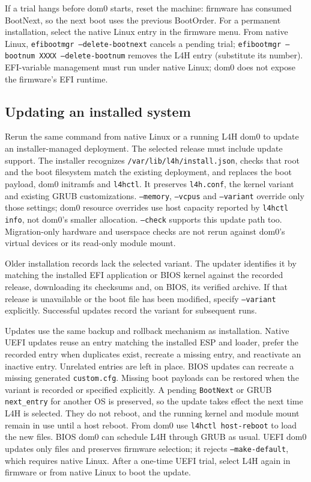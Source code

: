\documentclass[11pt,a4paper]{report}
\newcommand{\cmd}[1]{\texttt{#1}}
\newcommand{\file}[1]{\texttt{#1}}
\begin{document}
If a trial hangs before dom0 starts, reset the machine: firmware has
consumed BootNext, so the next boot uses the previous BootOrder. For a
permanent installation, select the native Linux entry in the firmware
menu. From native Linux, \cmd{efibootmgr --delete-bootnext} cancels a
pending trial; \cmd{efibootmgr --bootnum XXXX --delete-bootnum} removes
the L4H entry (substitute its number). EFI-variable management must run
under native Linux; dom0 does not expose the firmware's EFI runtime.

\subsection*{Updating an installed system}

Rerun the same command from native Linux or a running L4H dom0 to update
an installer-managed deployment. The selected release must include update
support. The installer recognizes \file{/var/lib/l4h/install.json},
checks that root and the boot filesystem match the existing deployment,
and replaces the boot payload, dom0 initramfs and \cmd{l4hctl}. It preserves
\file{l4h.conf}, the kernel variant and existing GRUB customizations.
\texttt{--memory}, \texttt{--vcpus} and \texttt{--variant} override only
those settings; dom0 resource overrides use host capacity reported by
\cmd{l4hctl info}, not dom0's smaller allocation. \texttt{--check} supports
this update path too. Migration-only hardware and userspace checks are
not rerun against dom0's virtual devices or its read-only module mount.

Older installation records lack the selected variant. The updater
identifies it by matching the installed EFI application or BIOS kernel
against the recorded release, downloading its checksums and, on BIOS,
its verified archive. If that release is unavailable or the boot file
has been modified, specify \texttt{--variant} explicitly. Successful
updates record the variant for subsequent runs.

Updates use the same backup and rollback mechanism as installation.
Native UEFI updates reuse an entry matching the installed ESP and loader,
prefer the recorded entry when duplicates exist, recreate a missing entry,
and reactivate an inactive entry. Unrelated entries are left in place.
BIOS updates can recreate a missing generated \file{custom.cfg}.
Missing boot payloads can be restored when the variant is recorded or
specified explicitly. A pending \texttt{BootNext} or GRUB
\texttt{next\_entry} for another OS is preserved, so the update takes
effect the next time L4H is selected.
They do not reboot, and the running kernel and module mount remain in
use until a host reboot. From dom0 use \cmd{l4hctl host-reboot} to load
the new files. BIOS dom0 can schedule L4H through GRUB as usual. UEFI
dom0 updates only files and preserves firmware selection; it rejects
\texttt{--make-default}, which requires native Linux. After a one-time
UEFI trial, select L4H again in firmware or from native Linux to boot
the update.
\end{document}
